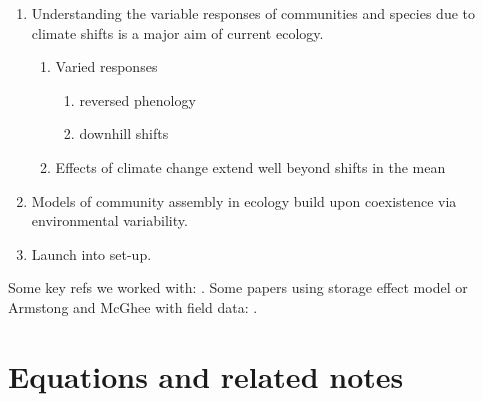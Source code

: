 \documentclass[11pt,a4paper,oneside]{article}
\begin{document}
\begin{enumerate}
\item Understanding the variable responses of communities and species
  due to climate shifts is a major aim of current
ecology.
\begin{enumerate}
\item Varied responses
\begin{enumerate}
\item reversed phenology \citep{yu2010} 
\item downhill shifts \citep{Crimmins:2011dq}
\end{enumerate}
\item Effects of climate change extend well beyond shifts in the mean
\end{enumerate}
\item Models of community assembly in ecology build upon coexistence
  via environmental variability.
\item Launch into set-up.
\end{enumerate}
\noindent Some key refs we worked with:
\citep{Chesson:1993gi,Chesson:2000ak,Chesson:2000vd,Chesson:2004eo}. Some
papers using storage effect model or Armstong and McGhee with field
data: \citep{Angert:2009,Kuang:2008ri,Kuang:2009rj,Levine:2009ym}.\\

\newpage
\section{Equations and related notes}
\end{document}

